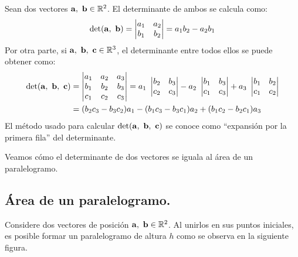 \documentclass[12pt]{article}
\begin{document}
Sean dos vectores $\mathbf{a}, \ \mathbf{b} \in \mathbb{R}^{2}$. El determinante de ambos se calcula como:
\[
\det(\mathbf{a}, \ \mathbf{b}) =
\begin{vmatrix}
a_{1} & a_{2} \\
b_{1} & b_{2}
\end{vmatrix} =
a_{1}b_{2} - a_{2}b_{1}
\]
Por otra parte, si $\mathbf{a}, \ \mathbf{b}, \ \mathbf{c} \in \mathbb{R}^{3}$, el determinante entre todos ellos se puede obtener como:
\begin{align*}
\det(\vecmat{a}, \ \vecmat{b}, \ \vecmat{c}) &=
\begin{vmatrix}
a_{1} & a_{2} & a_{3} \\
b_{1} & b_{2} & b_{3} \\
c_{1} & c_{2} & c_{3}
\end{vmatrix}
= a_{1} \ 
\begin{vmatrix}
b_{2} & b_{3} \\
c_{2} & c_{3}
\end{vmatrix}
- a_{2} \ 
\begin{vmatrix}
b_{1} & b_{3} \\
c_{1} & c_{3}
\end{vmatrix}
+ a_{3} \ 
\begin{vmatrix}
b_{1} & b_{2} \\
c_{1} & c_{2}
\end{vmatrix} \\
&= (b_{2}c_{3} - b_{3}c_{2}) a_{1} - (b_{1}c_{3} - b_{3}c_{1}) a_{2} + (b_{1}c_{2} - b_{2}c_{1}) a_{3}
\end{align*}
El método usado para calcular $\det(\vecmat{a}, \ \vecmat{b}, \ \vecmat{c})$ se conoce como ``expansión por la primera fila'' del determinante.

Veamos cómo el determinante de dos vectores se iguala al área de un paralelogramo.

\subsection{Área de un paralelogramo.}

Considere dos vectores de posición $\mathbf{a}, \ \mathbf{b} \in \mathbb{R}^{2}$. Al unirlos en sus puntos iniciales, es posible formar un paralelogramo de altura $h$ como se observa en la siguiente figura.
\end{document}
